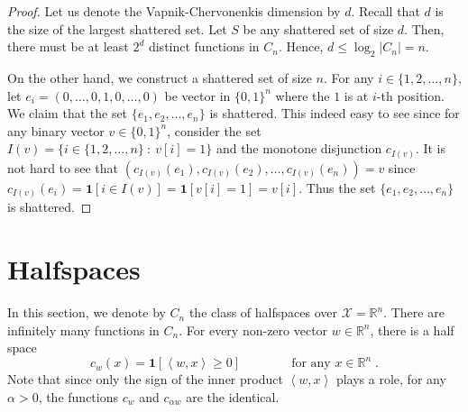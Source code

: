 \documentclass[10pt]{article}
\newcommand{\R}{\mathbb{R}}
\newcommand{\X}{\mathcal{X}}
\newcommand{\indicator}[1]{\mathbf{1}\left[{#1}\right]}
\newcommand{\ip}[2]{\left\langle #1, #2 \right\rangle}
\begin{document}
\begin{proof}
Let us denote the Vapnik-Chervonenkis dimension by $d$. Recall that $d$ is the
size of the largest shattered set. Let $S$ be any shattered set of size $d$.
Then, there must be at least $2^d$ distinct functions in $C_n$. Hence, $d \le
\log_2 |C_n| = n$.

On the other hand, we construct a shattered set of size $n$. For any $i \in
\{1,2,\dots,n\}$, let $e_i = (0, \dots, 0, 1, 0, \dots, 0)$ be vector in
$\{0,1\}^n$ where the $1$ is at $i$-th position. We claim that the set $\{e_1,
e_2, \dots, e_n\}$ is shattered. This indeed easy to see since for any binary
vector $v \in \{0,1\}^n$, consider the set $I(v) = \{ i \in \{1,2,\dots,n\} ~:~
v[i] = 1 \}$ and the monotone disjunction $c_{I(v)}$. It is not hard to see that
$(c_{I(v)}(e_1), c_{I(v)}(e_2), \dots, c_{I(v)}(e_n)) = v$ since $c_{I(v)}(e_i) =
\indicator{i \in I(v)} = \indicator{v[i] = 1} = v[i]$. Thus the set
$\{e_1, e_2, \dots, e_n\}$ is shattered.
\end{proof}


\section{Halfspaces}

In this section, we denote by $C_n$ the class of halfspaces over $\X = \R^n$. There
are infinitely many functions in $C_n$. For every non-zero vector $w \in \R^n$, there is a half space
$$
c_w(x) = \indicator{\ip{w}{x} \ge 0} \qquad \qquad \text{for any $x \in \R^n$} \; .
$$
Note that since only the sign of the inner product $\ip{w}{x}$ plays a role, for any $\alpha > 0$,
the functions $c_w$ and $c_{\alpha w}$ are the identical.




\end{document}
